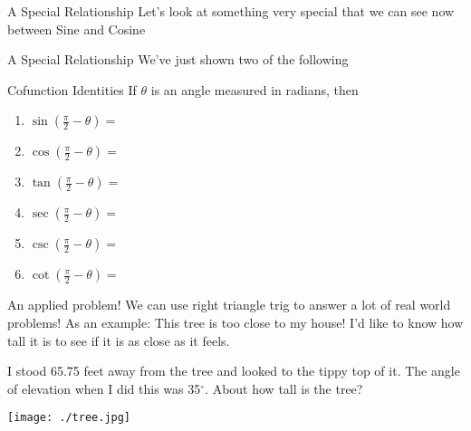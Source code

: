 \documentclass[presentation]{beamer}
\begin{document}
\begin{frame}[label={sec:org8fca351}]{A Special Relationship}
Let's look at something very special that we can see now between Sine and Cosine

\vspace{0.5in}
\end{frame}

\begin{frame}[label={sec:org0f8a709}]{A Special Relationship}
We've just shown two of the following

\begin{block}{Cofunction Identities}
If \(\theta\) is an angle measured in radians, then
\begin{enumerate}
\item \(\sin(\frac{\pi}{2} - \theta) =\)
\item \(\cos(\frac{\pi}{2} - \theta) =\)
\item \(\tan(\frac{\pi}{2} - \theta) =\)
\item \(\sec(\frac{\pi}{2} - \theta) =\)
\item \(\csc(\frac{\pi}{2} - \theta) =\)
\item \(\cot(\frac{\pi}{2} - \theta) =\)
\end{enumerate}
\end{block}
\end{frame}

\begin{frame}[label={sec:org5d49d42}]{An applied problem!}
We can use right triangle trig to answer a lot of real world problems!
As an example: This tree is too close to my house!  I'd like to know
how tall it is to see if it is as close as it feels.

I stood 65.75 feet away from the tree and looked to the tippy top of
it.  The \alert{angle of elevation} when I did this was 35\(^{\circ}.\)  About how
tall is the tree?

\texttt{[image: ./tree.jpg]}
\end{frame}
\end{document}
